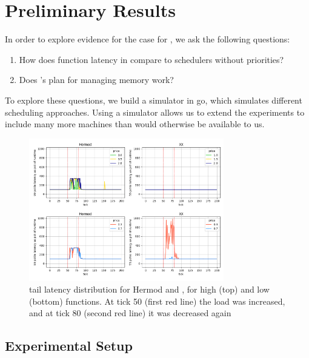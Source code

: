 \section{Preliminary Results}



In order to explore evidence for the case for \sys{}, we ask the following
questions: 
\begin{enumerate}
    \item How does function latency in \sys{} compare to schedulers without
    priorities?
    \item Does \sys{}'s plan for managing memory work?
\end{enumerate}


To explore these questions, we build a simulator in go\cite{golang}, which
simulates different scheduling approaches. Using a simulator allows us to extend
the experiments to include many more machines than would otherwise be available
to us.

\begin{figure}[t!]
    \centering
      \includegraphics[width=8.5cm]{img/hermod_xx_latencies.png}
      \caption{ tail latency distribution for Hermod and \sys{}, for high (top)
      and low (bottom) \priceclass{} functions. At tick 50 (first red line) the
      load was increased, and at tick 80 (second red line) it was decreased again
      }
    \label{fig:hermod-xx-latencies}
\end{figure}


\subsection{Experimental Setup}

